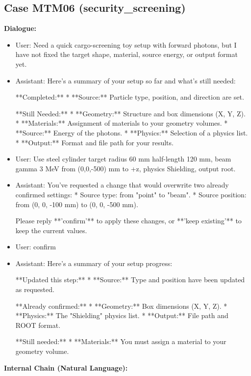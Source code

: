 \documentclass[11pt]{ctexart}
\begin{document}
\subsection{Case MTM06 (security\_screening)}
\textbf{Dialogue:}
\begin{itemize}
\item User: Need a quick cargo-screening toy setup with forward photons, but I have not fixed the target shape, material, source energy, or output format yet.
\item Assistant: Here's a summary of your setup so far and what's still needed:

**Completed:**
*   **Source:** Particle type, position, and direction are set.

**Still Needed:**
*   **Geometry:** Structure and box dimensions (X, Y, Z).
*   **Materials:** Assignment of materials to your geometry volumes.
*   **Source:** Energy of the photons.
*   **Physics:** Selection of a physics list.
*   **Output:** Format and file path for your results.
\item User: Use steel cylinder target radius 60 mm half-length 120 mm, beam gamma 3 MeV from (0,0,-500) mm to +z, physics Shielding, output root.
\item Assistant: You've requested a change that would overwrite two already confirmed settings:
*   Source type: from "point" to "beam".
*   Source position: from (0, 0, -100 mm) to (0, 0, -500 mm).

Please reply **'confirm'** to apply these changes, or **'keep existing'** to keep the current values.
\item User: confirm
\item Assistant: Here's a summary of your setup progress:

**Updated this step:**
*   **Source:** Type and position have been updated as requested.

**Already confirmed:**
*   **Geometry:** Box dimensions (X, Y, Z).
*   **Physics:** The "Shielding" physics list.
*   **Output:** File path and ROOT format.

**Still needed:**
*   **Materials:** You must assign a material to your geometry volume.
\end{itemize}
\textbf{Internal Chain (Natural Language):}
\end{document}
